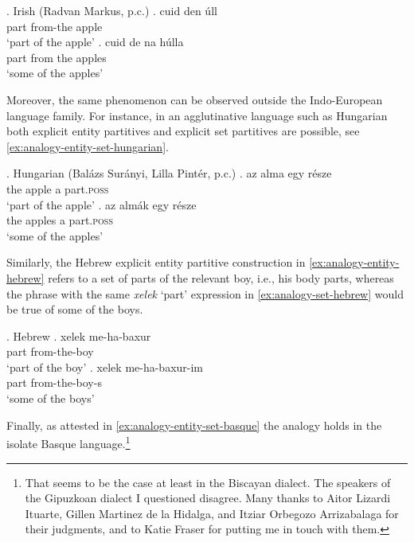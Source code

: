 		\ex.\label{ex:analogy-entity-set-irish} Irish (Radvan Markus, p.c.) 
        \ag. cuid den úll\label{ex:analogy-entity-irish}\\
		part from-the apple\\
		`part of the apple'
		\bg. cuid de na húlla\label{ex:analogy-set-irish}\\
		part from the apples\\
        `some of the apples'

Moreover, the same phenomenon can be observed outside the Indo-European language family. For instance, in an agglutinative language such as Hungarian both explicit entity partitives and explicit set partitives are possible, see \ref{ex:analogy-entity-set-hungarian}. 

\ex.\label{ex:analogy-entity-set-hungarian} Hungarian (Balázs Surányi, Lilla Pintér, p.c.)
\ag. az alma egy része\label{ex:analogy-entity-hungarian}\\
the apple a part\textsc{.poss}\\
`part of the apple'
\bg. az almák egy része\label{ex:analogy-set-hungarian}\\
the apples a part\textsc{.poss}\\
`some of the apples'

Similarly, the Hebrew explicit entity partitive construction in \ref{ex:analogy-entity-hebrew} refers to a set of parts of the relevant boy, i.e., his body parts, whereas the phrase with the same \textit{xelek} `part' expression in \ref{ex:analogy-set-hebrew} would be true of some of the boys. 

\ex.\label{ex:analogy-entity-set-hebrew} Hebrew \citep[p. 184; adapted]{schwarzschild1996pluralities}
\ag. xelek me-ha-baxur\label{ex:analogy-entity-hebrew}\\
part from-the-boy\\
`part of the boy'
\bg. xelek me-ha-baxur-im\label{ex:analogy-set-hebrew}\\
part from-the-boy-s\\
`some of the boys'

Finally, as attested in \ref{ex:analogy-entity-set-basque} the analogy holds in the isolate Basque language.\footnote{That seems to be the case at least in the Biscayan dialect. The speakers of the Gipuzkoan dialect I questioned disagree. Many thanks to Aitor Lizardi Ituarte, Gillen Martinez de la Hidalga, and Itziar Orbegozo Arrizabalaga for their judgments, and to Katie Fraser for putting me in touch with them.}

